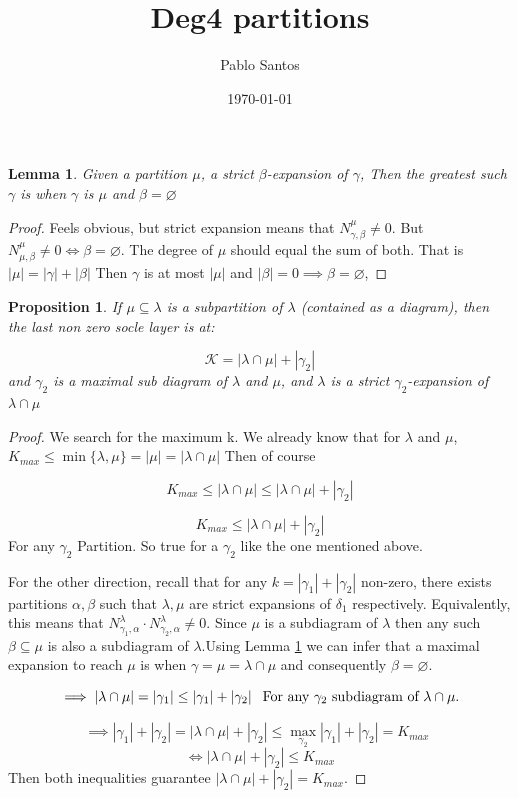 \documentclass[a4paper,12pt]{article}
\title{Deg4 partitions}
\author{Pablo Santos}
\date{\today}
\theoremstyle{plain}
\newtheorem{proposition}[theorem]{Proposition}
\newtheorem{lemma}[theorem]{Lemma}
\theoremstyle{remark}
\begin{document}
\maketitle

\begin{lemma} \label{lem_best_int}
    Given a partition $\mu$, a strict $\beta$-expansion of $\gamma$, Then the greatest such $\gamma$ is when $\gamma$ is $\mu$ and  $\beta = \varnothing$
\end{lemma}

\begin{proof}
    Feels obvious, but strict expansion means that $N^{\mu}_{\gamma, \beta} \neq 0$. But  $N^{\mu}_{\mu, \beta} \neq 0 \iff \beta = \varnothing $. The degree of $\mu$ should equal the sum of both. That is $ |\mu| = |\gamma| + |\beta|$
    Then $\gamma$ is at most $|\mu|$ and $|\beta| = 0 \implies \beta = \varnothing$,
\end{proof}

\begin{proposition} If $\mu \subseteq \lambda$ is a subpartition  of $\lambda$ (contained as a diagram), then the last non zero socle layer is at:

    $$
        \mathcal{K} = |\lambda \cap \mu| + |\gamma_2|
    $$
and $\gamma_2$ is a maximal sub diagram of $\lambda$ and $\mu$, and $\lambda$ is a strict $\gamma_2$-expansion of $\lambda \cap \mu$
\end{proposition}

\begin{proof}

    We search for the maximum k. We already know that for $\lambda$ and $\mu$, $K_{max} \leq \operatorname{min}\{\lambda, \mu\} = | \mu| = |\lambda \cap \mu|$ Then of course 
    
    $$K_{max} \leq |\lambda \cap \mu| \leq |\lambda \cap \mu| + |\gamma_2|$$

    $$K_{max} \leq |\lambda \cap \mu| + |\gamma_2|$$
    For any $\gamma_2$ Partition. So  true for a $\gamma_2$ like the one mentioned above.

    For the other direction, recall that for any $k = |\gamma_1| + |\gamma_2|$ non-zero, there exists partitions $\alpha,\beta$ such that $\lambda, \mu$ are strict expansions of $\delta_1$ respectively. Equivalently, this means that $ N^\lambda_{\gamma_1, \alpha} \cdot N^\lambda_{\gamma_2, \alpha} \neq 0$. Since $\mu$ is a subdiagram of $\lambda$ then any such $\beta \subseteq \mu$ is also a subdiagram of $\lambda$.Using Lemma \ref{lem_best_int} we can infer that a maximal expansion to reach $\mu$ is when $\gamma = \mu = \lambda\cap\mu$ and consequently $\beta = \varnothing$.

    $$
    \implies |\lambda \cap \mu| = |\gamma_1| \leq
     |\gamma_1| + |\gamma_2| \: \: \textnormal{ For any } \gamma_2 \textnormal{ subdiagram of } \lambda \cap \mu.$$

    $$
    \implies |\gamma_1| + |\gamma_2| = |\lambda \cap \mu| + |\gamma_2| \leq
      \operatorname*{max}_{\gamma_2}|\gamma_1| + |\gamma_2| = K_{max}\: \: $$
    $$
    \iff |\lambda \cap \mu| + |\gamma_2| \leq K_{max}
    $$
    Then both inequalities guarantee $|\lambda \cap \mu| + |\gamma_2| = K_{max}$.
\end{proof}
\end{document}
